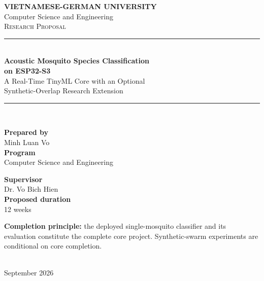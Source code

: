 \documentclass[a4paper,11pt]{article}
\begin{document}
\begin{titlepage}
\centering
\vspace*{0.9cm}
{\Large\bfseries VIETNAMESE-GERMAN UNIVERSITY}\\[0.3cm]
{\large Computer Science and Engineering}\\[1.6cm]
{\Large\textsc{Research Proposal}}\\[0.7cm]
{\color{navy}\rule{\linewidth}{0.7mm}}\\[0.55cm]
{\LARGE\bfseries Acoustic Mosquito Species Classification\\[0.2cm]
on ESP32-S3}\\[0.5cm]
{\large A Real-Time TinyML Core with an Optional\\[0.12cm]
Synthetic-Overlap Research Extension}\\[0.55cm]
{\color{navy}\rule{\linewidth}{0.7mm}}\\[1.15cm]
\begin{minipage}[t]{0.46\textwidth}\raggedright\large
\textbf{Prepared by}\\[0.15cm]Minh Luan Vo\\[0.55cm]
\textbf{Program}\\[0.15cm]Computer Science and Engineering
\end{minipage}\hfill
\begin{minipage}[t]{0.46\textwidth}\raggedright\large
\textbf{Supervisor}\\[0.15cm]Dr. Vo Bich Hien\\[0.55cm]
\textbf{Proposed duration}\\[0.15cm]12 weeks
\end{minipage}
\vfill
\begin{minipage}{0.9\textwidth}\centering
\textbf{Completion principle:} the deployed single-mosquito classifier and its evaluation constitute the complete core project. Synthetic-swarm experiments are conditional on core completion.
\end{minipage}\\[0.8cm]
{\large September 2026}
\end{titlepage}
\end{document}
